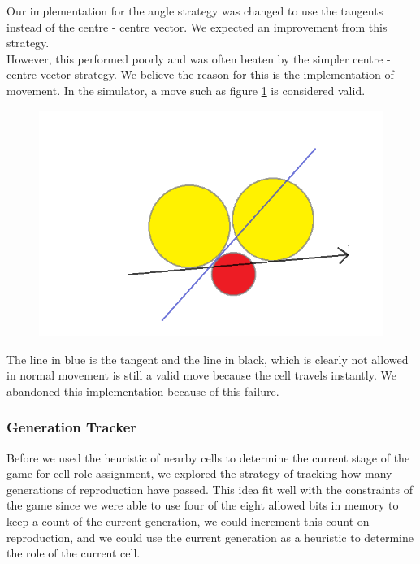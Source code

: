 Our implementation for the angle strategy was changed to use the tangents instead of the centre - centre vector. We expected an improvement from this strategy.\\
However, this performed poorly and was often beaten by the simpler centre - centre vector strategy. We believe the reason for this is the implementation of movement. In the simulator, a move such as figure \ref{fig:tangents2} is considered valid.\\

\begin{figure}[!htb]
\center
\includegraphics[scale=0.6]{tangents2.png}
\caption{}
\label{fig:tangents2}
\end{figure}

The line in blue is the tangent and the line in black, which is clearly not allowed in normal movement is still a valid move because the cell travels instantly. We abandoned this implementation because of this failure.\\

\subsubsection{Generation Tracker}
Before we used the heuristic of nearby cells to determine the current stage of the game for cell role assignment, we explored the strategy of tracking how many generations of reproduction have passed. This idea fit well with the constraints of the game since we were able to use four of the eight allowed bits in memory to keep a count of the current generation, we could increment this count on reproduction, and we could use the current generation as a heuristic to determine the role of the current cell.\\

